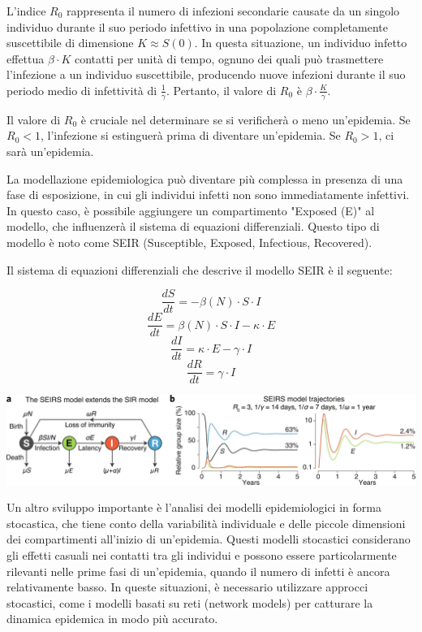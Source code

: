 L'indice $R_0$ rappresenta il numero di infezioni secondarie causate da 
un singolo individuo durante il suo periodo infettivo in una popolazione 
completamente suscettibile di dimensione $K \approx S(0)$. In questa 
situazione, un individuo infetto effettua $\beta \cdot K$ contatti per 
unità di tempo, ognuno dei quali può trasmettere l'infezione a un 
individuo suscettibile, producendo nuove infezioni durante il suo periodo 
medio di infettività di $\frac{1}{\gamma}$. Pertanto, il valore 
di $R_0$ è $\beta \cdot \frac{K}{\gamma}$.

Il valore di $R_0$ è cruciale nel determinare se si verificherà o meno 
un'epidemia. Se $R_0 < 1$, l'infezione si estinguerà prima di diventare 
un'epidemia. Se $R_0 > 1$, ci sarà un'epidemia.

La modellazione epidemiologica può diventare più complessa in presenza 
di una fase di esposizione, in cui gli individui infetti non sono 
immediatamente infettivi. In questo caso, è possibile aggiungere un 
compartimento "Exposed (E)" al modello, che influenzerà il sistema di 
equazioni differenziali. Questo tipo di modello è noto come SEIR 
(Susceptible, Exposed, Infectious, Recovered).

Il sistema di equazioni differenziali che descrive il modello SEIR è il seguente:

\[ \frac{dS}{dt} = - \beta(N) \cdot S \cdot I \]
\[ \frac{dE}{dt} = \beta(N) \cdot S \cdot I - \kappa \cdot E \]
\[ \frac{dI}{dt} = \kappa \cdot E - \gamma \cdot I \]
\[ \frac{dR}{dt} = \gamma \cdot I \]

\begin{minipage}{\linewidth}
    \centering
    \includegraphics[width=\textwidth]{img/41592_2020_856_Fig1_HTML.png}
    \label{fig:SEIRS_model}
\end{minipage}

Un altro sviluppo importante è l'analisi dei modelli epidemiologici in 
forma stocastica, che tiene conto della variabilità individuale e delle 
piccole dimensioni dei compartimenti all'inizio di un'epidemia. 
Questi modelli stocastici considerano gli effetti casuali nei contatti 
tra gli individui e possono essere particolarmente rilevanti nelle prime 
fasi di un'epidemia, quando il numero di infetti è ancora relativamente 
basso. In queste situazioni, è necessario utilizzare approcci stocastici, 
come i modelli basati su reti (network models) per catturare la dinamica 
epidemica in modo più accurato.

